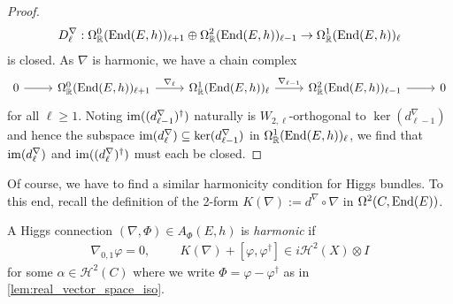 \documentclass[12pt]{ociamthesis}  %
\begin{document}
\begin{lemma}
\begin{proof}
\begin{align*}
      D^\nabla_\ell :
      \Omega^0_{\mathbb R}(\operatorname{End}(E,h))_{\ell+1}
      \oplus \Omega^2_{\mathbb R}(\operatorname{End}(E,h))_{\ell-1}
      \to \Omega^1_{\mathbb R}(\operatorname{End}(E,h))_\ell
    \end{align*}
    is closed. As $\nabla$ is harmonic, we have a chain complex 
    \begin{equation*}
      \begin{tikzcd}
        0 & {\Omega^0_{\mathbb R}(\End(E,h))_{\ell+1}} & {\Omega^1_{\mathbb R}(\End(E,h))_\ell} & {\Omega^2_{\mathbb R}(\End(E,h))_{\ell-1}} & 0
        \arrow[from=1-1, to=1-2]
        \arrow["{\nabla_\ell}", from=1-2, to=1-3]
        \arrow["{\nabla_{\ell-1}}", from=1-3, to=1-4]
        \arrow[from=1-4, to=1-5]
      \end{tikzcd}
    \end{equation*}
    for all $\ell\geq 1$.  Noting $\operatorname{im}((d^\nabla_{\ell-1})^\dagger)$
    naturally is $W_{2,\ell}$-orthogonal to $\ker(d^\nabla_{\ell-1})$
    and hence the subspace $\operatorname{im}(d^\nabla_{\ell})\subseteq\ker(d^\nabla_{\ell-1})$
    in $\Omega^1_{\mathbb R}(\operatorname{End}(E,h))_\ell$, we find that
    $\operatorname{im}(d^\nabla_\ell)$ and $\operatorname{im}((d^\nabla_\ell)^\dagger)$ must each be
    closed.
  \end{proof}
\end{lemma}

Of course, we have to find a similar harmonicity condition for
Higgs bundles. To this end, recall the definition
of the 2-form $K(\nabla) := d^\nabla \circ \nabla$
in $\Omega^2(C,\operatorname{End}(E))$.

\begin{definition}
  A Higgs connection $(\nabla,\Phi)\in A_\Phi(E,h)$
  is \emph{harmonic} if
  \begin{align}\label{eq:Hitchin_equations}
    \nabla_{0,1}\varphi = 0,\hspace{1cm}
    K(\nabla) + [\varphi,\varphi^\dagger] \in i\mathcal H^2(X)\otimes I
  \end{align}
  for some $\alpha\in\mathcal H^2(C)$ where we write
  $\Phi = \varphi - \varphi^\dagger$ as in \ref{lem:real_vector_space_iso}.
\end{definition}
\end{document}
